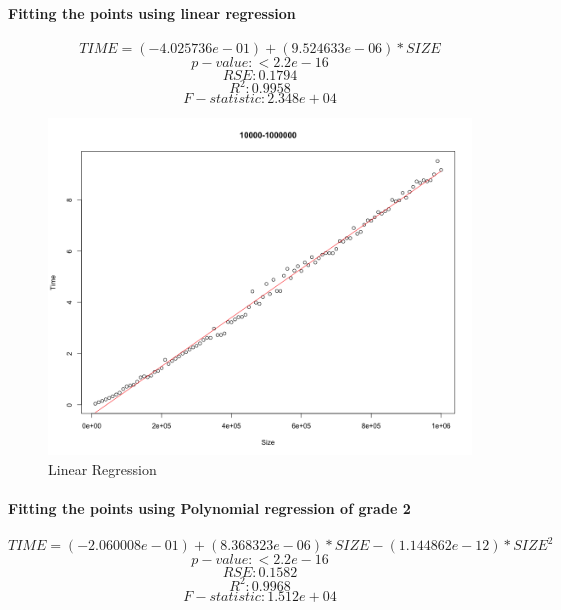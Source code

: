 \documentclass[14pt, oneside]{article}
\begin{document}
\paragraph{Fitting the points using linear regression}

$$ TIME = (-4.025736e-01) + (9.524633e-06 )*SIZE $$
$$ p-value: < 2.2e-16 $$
$$ RSE: 0.1794 $$
$$ R^{2}:  0.9958 $$
$$ F-statistic: 2.348e+04 $$

\begin{figure}[H]
\centering
\includegraphics[width=\linewidth]{Rplot04.png}
\caption{Linear Regression}
\end{figure}


\paragraph{Fitting the points using Polynomial regression of grade 2}
$$ TIME = (-2.060008e-01) + (8.368323e-06)*SIZE  - (1.144862e-12)*SIZE^{2}$$
$$ p-value: < 2.2e-16 $$
$$ RSE: 0.1582  $$
$$ R^{2}:  0.9968 $$
$$ F-statistic: 1.512e+04$$
\end{document}
